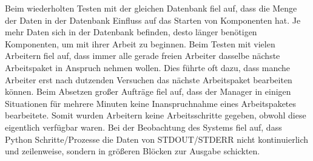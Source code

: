 \begin{description}
        Beim wiederholten Testen mit der gleichen Datenbank fiel auf, dass die Menge der Daten in der Datenbank Einfluss auf das Starten von Komponenten hat. Je mehr Daten sich in der Datenbank befinden, desto länger benötigen Komponenten, um mit ihrer Arbeit zu beginnen.
        Beim Testen mit vielen Arbeitern fiel auf, dass immer alle gerade freien Arbeiter dasselbe nächste Arbeitspaket in Anspruch nehmen wollen. Dies führte oft dazu, dass manche Arbeiter erst nach dutzenden Versuchen das nächste Arbeitspaket bearbeiten können.
        Beim Absetzen großer Aufträge fiel auf, dass der Manager in einigen Situationen für mehrere Minuten keine Inanspruchnahme eines Arbeitspaketes bearbeitete. Somit wurden Arbeitern keine Arbeitsschritte gegeben, obwohl diese eigentlich verfügbar waren.
        Bei der Beobachtung des Systems fiel auf, dass Python Schritte/Prozesse
        die Daten von STDOUT/STDERR nicht kontinuierlich und zeilenweise,
        sondern in größeren Blöcken zur Ausgabe schickten.
\end{description}


